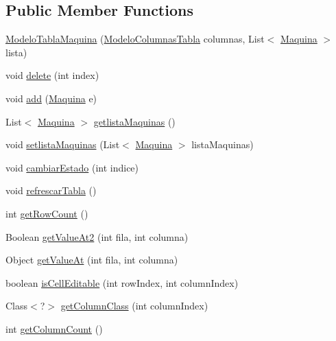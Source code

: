 \subsection*{Public Member Functions}
\begin{DoxyCompactItemize}
\item 
\mbox{\hyperlink{classmodelos_1_1_modelo_tabla_maquina_a1a20d87af57c2ec9a090f9f164f616cc}{Modelo\+Tabla\+Maquina}} (\mbox{\hyperlink{classmodelos_1_1_modelo_columnas_tabla}{Modelo\+Columnas\+Tabla}} columnas, List$<$ \mbox{\hyperlink{classobjetos_1_1_maquina}{Maquina}} $>$ lista)
\item 
void \mbox{\hyperlink{classmodelos_1_1_modelo_tabla_maquina_aac1f2793dfa5765b8e66c17891753e10}{delete}} (int index)
\item 
void \mbox{\hyperlink{classmodelos_1_1_modelo_tabla_maquina_aa49c15eda1d441b2a17159f0aa80cef4}{add}} (\mbox{\hyperlink{classobjetos_1_1_maquina}{Maquina}} e)
\item 
List$<$ \mbox{\hyperlink{classobjetos_1_1_maquina}{Maquina}} $>$ \mbox{\hyperlink{classmodelos_1_1_modelo_tabla_maquina_a557771e167f337141e22d3d4a0432b7b}{getlista\+Maquinas}} ()
\item 
void \mbox{\hyperlink{classmodelos_1_1_modelo_tabla_maquina_a559a21bd653aa7b639fa598ff22fa5f7}{setlista\+Maquinas}} (List$<$ \mbox{\hyperlink{classobjetos_1_1_maquina}{Maquina}} $>$ lista\+Maquinas)
\item 
void \mbox{\hyperlink{classmodelos_1_1_modelo_tabla_maquina_ab8ce1d5c3842d65c11a8c8cb10f5b7f7}{cambiar\+Estado}} (int indice)
\item 
void \mbox{\hyperlink{classmodelos_1_1_modelo_tabla_maquina_a48d1751bbb3bfb91d50eb5bd2a80207e}{refrescar\+Tabla}} ()
\item 
int \mbox{\hyperlink{classmodelos_1_1_modelo_tabla_maquina_aa380cce066ff74a0a7f95ae4d9388eb9}{get\+Row\+Count}} ()
\item 
Boolean \mbox{\hyperlink{classmodelos_1_1_modelo_tabla_maquina_a76d930fbec2a211e91095ac641f030cb}{get\+Value\+At2}} (int fila, int columna)
\item 
Object \mbox{\hyperlink{classmodelos_1_1_modelo_tabla_maquina_ae6611198ecf631949ddb041b8231da95}{get\+Value\+At}} (int fila, int columna)
\item 
boolean \mbox{\hyperlink{classmodelos_1_1_modelo_tabla_maquina_ab81f2b02aa2cc4c0f9c93111ba345df8}{is\+Cell\+Editable}} (int row\+Index, int column\+Index)
\item 
Class$<$?$>$ \mbox{\hyperlink{classmodelos_1_1_modelo_tabla_maquina_a29f3df9756e2a5e9a66bde094a1ee56e}{get\+Column\+Class}} (int column\+Index)
\item 
int \mbox{\hyperlink{classmodelos_1_1_modelo_tabla_maquina_a83f4d721197d932523e11de1155cbad6}{get\+Column\+Count}} ()
\end{DoxyCompactItemize}


